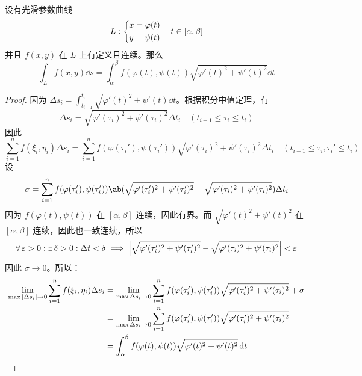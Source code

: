 \begin{theorem}
	设有光滑参数曲线
	$$
	L: \begin{dcases}
		x = \varphi(t) \\
		y = \psi(t)
	\end{dcases} \quad t \in [\alpha, \beta]
	$$
	并且 $f(x, y)$ 在 $L$ 上有定义且连续。那么
	$$
	\int_L f(x, y) \dd{s} = \int_{\alpha}^{\beta} f(\varphi(t), \psi(t)) \sqrt{\varphi'(t)^2 + \psi'(t)^2} \dd{t}
	$$
	\begin{proof}
		因为 $\displaystyle \Delta s_i = \int_{t_{i - 1}}^{t_i} \sqrt{\varphi'(t)^2 + \psi'(t)} \dd{t}$。根据积分中值定理，有
		$$
		\Delta s_i = \sqrt{\varphi'(\tau_i)^2 + \psi'(\tau_i)^2} \Delta t_i \quad (t_{i - 1} \le \tau_i \le t_i)
		$$
		因此
		$$
		\sum_{i = 1}^{n} f(\xi_i, \eta_i) \Delta s_i = \sum_{i = 1}^{n} f(\varphi(\tau_i'), \psi(\tau_i')) \sqrt{\varphi'(\tau_i)^2 + \psi'(\tau_i)^2} \Delta t_i \quad (t_{i - 1} \le  \tau_i, \tau_i' \le t_i)
		$$
		设
		$$
		\sigma = \sum_{i = 1}^{n} f(\varphi(\tau_i'), \psi(\tau_i')) \ab(\sqrt{\varphi'(\tau_i')^2 + \psi'(\tau_i')^2} - \sqrt{\varphi'(\tau_i)^2 + \psi'(\tau_i)^2}) \Delta t_i
		$$
		因为 $f(\varphi(t), \psi(t))$ 在 $[\alpha, \beta]$ 连续，因此有界。而 $\sqrt{\varphi'(t)^2 + \psi'(t)^2}$ 在 $[\alpha, \beta]$ 连续，因此也一致连续，所以
		$$
		\forall\,\varepsilon > 0: \exists\,\delta > 0: \Delta t < \delta \implies \abs{\sqrt{\varphi'(\tau_i')^2 + \psi'(\tau_i')^2} - \sqrt{\varphi'(\tau_i)^2 + \psi'(\tau_i)^2}} < \varepsilon
		$$
		因此 $\sigma \to 0$。所以：
		$$
		\begin{aligned}
			\lim_{\max \abs{\Delta s_i} \to 0} \sum_{i = 1}^{n} f(\xi_i, \eta_i) \Delta s_i & = \lim_{\max \Delta s_i \to 0} \sum_{i = 1}^{n} f(\varphi(\tau_i'), \psi(\tau_i')) \sqrt{\varphi'(\tau'_i)^2 + \psi'(\tau_i)^2} + \sigma \\
			& = \lim_{\max \Delta s_i \to 0} \sum_{i = 1}^{n} f(\varphi(\tau_i'), \psi(\tau_i')) \sqrt{\varphi'(\tau'_i)^2 + \psi'(\tau_i)^2} \\
			& = \int_{\alpha}^{\beta} f(\varphi(t), \psi(t)) \sqrt{\varphi'(t)^2 + \psi'(t)^2} \dd{t}
		\end{aligned}
		$$
	\end{proof}
\end{theorem}